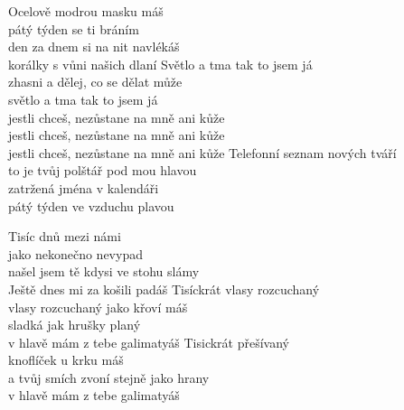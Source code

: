 \ve
{}Ocelově modrou masku máš\\
pátý týden se ti bráním\\
den za dnem si na nit navlékáš\\
korálky s vůni našich dlaní
\re{*:}
Světlo a tma tak  to jsem já\\
zhasni a dělej, co se dělat může\\
světlo a tma tak to jsem já\\
jestli chceš, nezůstane na mně ani kůže\\
jestli chceš, nezůstane na mně ani kůže\\
jestli chceš, nezůstane na mně ani kůže
\ve
Telefonní seznam nových tváří\\
to je tvůj polštář pod mou hlavou\\
zatržená jména v kalendáři\\
pátý týden ve vzduchu plavou

\re{*:}

\cho
{}Tisíc dnů mezi námi\\
jako nekonečno nevypad\\
našel jsem tě kdysi ve stohu slámy\\
Ještě dnes mi za košili padáš
\cho
Tisíckrát vlasy rozcuchaný\\
vlasy rozcuchaný jako křoví máš\\
sladká jak hrušky planý\\
v hlavě mám z tebe galimatyáš
\cho
Tisickrát přešívaný\\
knoflíček u krku máš\\
a tvůj smích zvoní stejně jako hrany\\
v hlavě mám z tebe galimatyáš
\esong
